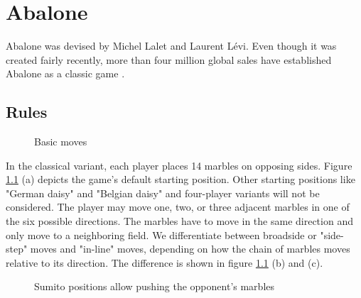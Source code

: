\chapter{Abalone}
\label{abalone}
Abalone was devised by Michel Lalet and Laurent Lévi. Even though it was created fairly recently, more than four million global sales have established Abalone as a classic game \cite{noauthor_abalone_2020}.

\section{Rules}

\begin{figure}[!h]
    \centering
    \hfill
    \hfill
    \caption{Basic moves \cite{abalone_sa_abalone_nodate}}
    \label{basics}
\end{figure}

In the classical variant, each player places 14 marbles on opposing sides. Figure \ref{basics} (a) depicts the game's default starting position. Other starting positions like "German daisy" and "Belgian daisy" and four-player variants will not be considered. The player may move one, two, or three adjacent marbles in one of the six possible directions. The marbles have to move in the same direction and only move to a neighboring field. We differentiate between broadside or "side-step" moves and "in-line" moves, depending on how the chain of marbles moves relative to its direction. The difference is shown in figure \ref{basics} (b) and (c).

\begin{figure}[!h]
    \centering
    \hfill
    \hfill
    \caption{Sumito positions allow pushing the opponent's marbles \cite{abalone_sa_abalone_nodate}}
    \label{sumito}
\end{figure}

